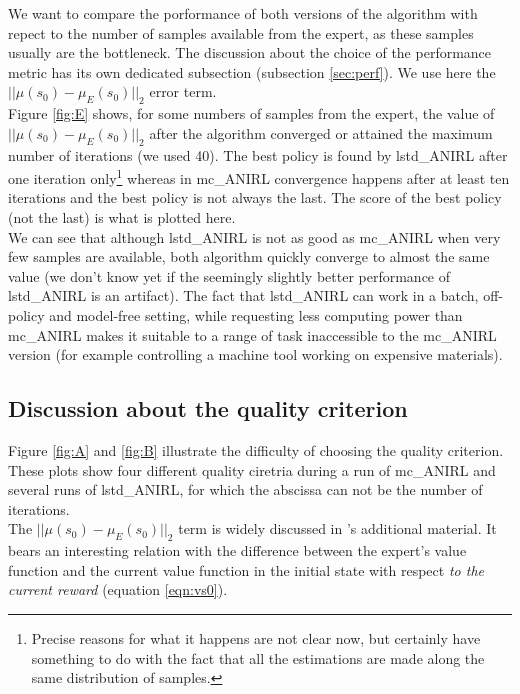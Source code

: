 \documentclass{jfpda2011}
\begin{document}
We want to compare the porformance of both versions of the algorithm with repect to the number of samples available from the expert, as these samples usually are the bottleneck. The discussion about the choice of the performance metric has its own dedicated subsection (subsection \ref{sec:perf}). We use here the $||\mu(s_0) - \mu_E(s_0)||_2$ error term.\\

Figure \ref{fig:E} shows, for some numbers of samples from the expert, the value of $||\mu(s_0)-\mu_E(s_0)||_2$ after the algorithm converged or attained the maximum number of iterations (we used 40). The best policy is found by lstd\_ANIRL after one iteration only\footnote{Precise reasons for what it happens are not clear now, but certainly have something to do with the fact that all the estimations are made along the same distribution of samples.} whereas in mc\_ANIRL convergence happens after at least ten iterations and the best policy is not always the last. The score of the best policy (not the last) is what is plotted here.\\

We can see that although lstd\_ANIRL is not as good as mc\_ANIRL when very few samples are available, both algorithm quickly converge to almost the same value (we don't know yet if the seemingly slightly better performance of lstd\_ANIRL is an artifact). The fact that lstd\_ANIRL can work in a batch, off-policy and model-free setting, while requesting less computing power than mc\_ANIRL makes it suitable to a range of task inaccessible to the mc\_ANIRL version (for example controlling a machine tool working on expensive materials).
\subsection{Discussion about the quality criterion}
Figure \ref{fig:A} and \ref{fig:B} illustrate the difficulty of choosing the quality criterion. These plots show four different quality ciretria during a run of mc\_ANIRL and several runs of lstd\_ANIRL, for which the abscissa can not be the number of iterations.\\

The $||\mu(s_0) - \mu_E(s_0)||_2$ term is widely discussed in \citep{abbeel2004apprenticeship}'s additional material. It bears an interesting relation with the difference between the expert's value function and the current value function in the initial state with respect \emph{to the current reward} (equation \ref{eqn:vs0}).\\
\end{document}

